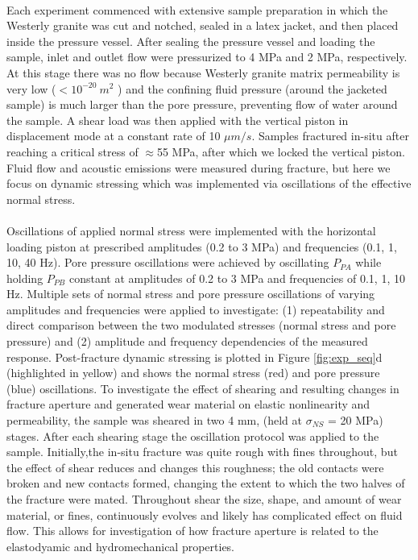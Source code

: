 \documentclass[letterpaper,10pt]{article}
\begin{document}
\paragraph{}
Each experiment commenced with extensive sample preparation in which the Westerly granite was cut and notched, sealed in a latex jacket, and then placed inside the pressure vessel. After sealing the pressure vessel and loading the sample, inlet and outlet flow were pressurized to 4 MPa and 2 MPa, respectively. At this stage there was no flow because Westerly granite matrix permeability is very low ($< 10^{-20}\ m^2$ ) and the confining fluid pressure (around the jacketed sample) is much larger than the pore pressure, preventing flow of water around the sample.
A shear load was then applied with the vertical piston in displacement mode at a constant rate of 10 $\mu m/s$. Samples fractured in-situ after reaching a critical stress of $ \approx $55 MPa, after which we locked the vertical piston. Fluid flow and acoustic emissions were measured during fracture, but here we focus on dynamic stressing which was implemented via oscillations of the effective normal stress.
\paragraph{}
Oscillations of applied normal stress were implemented with the horizontal loading piston at prescribed amplitudes (0.2 to 3 MPa) and frequencies (0.1, 1, 10, 40 Hz). Pore pressure oscillations were achieved by oscillating $P_{PA}$ while holding $P_{PB}$ constant at amplitudes of 0.2 to 3 MPa and frequencies of 0.1, 1, 10 Hz. Multiple sets of normal stress and pore pressure oscillations of varying amplitudes and frequencies were applied to investigate: (1) repeatability and direct comparison between the two modulated stresses (normal stress and pore pressure) and (2) amplitude and frequency dependencies of the measured response. Post-fracture dynamic stressing is plotted in Figure \ref{fig:exp_seq}d (highlighted in yellow) and shows the normal stress (red) and pore pressure (blue) oscillations.
To investigate the effect of shearing and resulting changes in fracture aperture and generated wear material on elastic nonlinearity and permeability, the sample was sheared in two 4 mm, (held at $ \sigma_{NS} $ = 20 MPa) stages. After each shearing stage the oscillation protocol was applied to the sample. Initially,the in-situ fracture was quite rough with fines throughout, but the effect of shear reduces and changes this roughness; the old contacts were broken and new contacts formed, changing the extent to which the two halves of the fracture were mated. Throughout shear the size, shape, and amount of wear material, or fines, continuously evolves and likely has complicated effect on fluid flow. This allows for investigation of how fracture aperture is related to the elastodyamic and hydromechanical properties.
\end{document}
